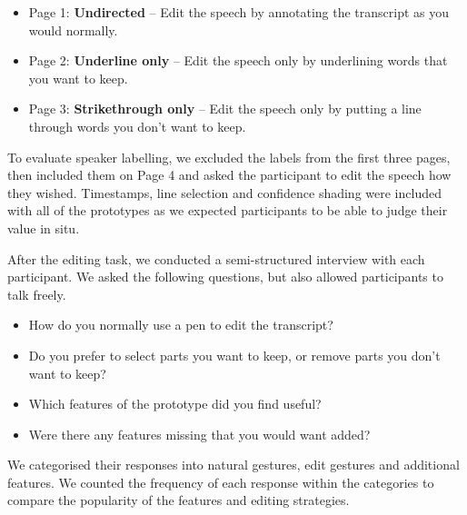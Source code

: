 
\begin{itemize}
  \item Page 1: \textbf{Undirected} -- Edit the speech by annotating the transcript as you would normally.
  \item Page 2: \textbf{Underline only} -- Edit the speech only by underlining words that you want to keep.
  \item Page 3: \textbf{Strikethrough only} -- Edit the speech only by putting a line through words you don't
        want to keep.
\end{itemize}

To evaluate speaker labelling, we excluded the labels from the first three pages, then included them on Page 4
and asked the participant to edit the speech how they wished.  Timestamps, line selection and confidence shading were
included with all of the prototypes as we expected participants to be able to judge their value in situ.

After the editing task, we conducted a semi-structured interview with each participant.
We asked the following questions, but also allowed participants to talk freely.

{\singlespacing
  \begin{itemize}
    \item How do you normally use a pen to edit the transcript?
    \item Do you prefer to select parts you want to keep, or remove parts you don't want to keep?
    \item Which features of the prototype did you find useful?
    \item Were there any features missing that you would want added?
  \end{itemize}
}

We categorised their responses into natural gestures, edit gestures and additional features. We counted the frequency
of each response within the categories to compare the popularity of the features and editing strategies.


